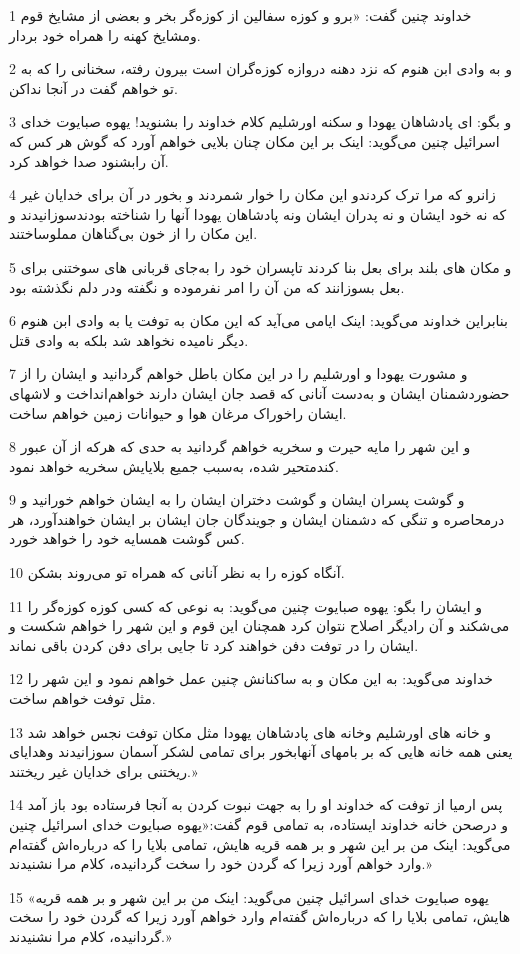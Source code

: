 \par 1 خداوند چنین گفت: «برو و کوزه سفالین از کوزه‌گر بخر و بعضی از مشایخ قوم ومشایخ کهنه را همراه خود بردار.
\par 2 و به وادی ابن هنوم که نزد دهنه دروازه کوزه‌گران است بیرون رفته، سخنانی را که به تو خواهم گفت در آنجا نداکن.
\par 3 و بگو: ای پادشاهان یهودا و سکنه اورشلیم کلام خداوند را بشنوید! یهوه صبایوت خدای اسرائیل چنین می‌گوید: اینک بر این مکان چنان بلایی خواهم آورد که گوش هر کس که آن رابشنود صدا خواهد کرد.
\par 4 زانرو که مرا ترک کردندو این مکان را خوار شمردند و بخور در آن برای خدایان غیر که نه خود ایشان و نه پدران ایشان ونه پادشاهان یهودا آنها را شناخته بودندسوزانیدند و این مکان را از خون بی‌گناهان مملوساختند.
\par 5 و مکان های بلند برای بعل بنا کردند تاپسران خود را به‌جای قربانی های سوختنی برای بعل بسوزانند که من آن را امر نفرموده و نگفته ودر دلم نگذشته بود.
\par 6 بنابراین خداوند می‌گوید: اینک ایامی می‌آید که این مکان به توفت یا به وادی ابن هنوم دیگر نامیده نخواهد شد بلکه به وادی قتل.
\par 7 و مشورت یهودا و اورشلیم را در این مکان باطل خواهم گردانید و ایشان را از حضوردشمنان ایشان و به‌دست آنانی که قصد جان ایشان دارند خواهم‌انداخت و لاشهای ایشان راخوراک مرغان هوا و حیوانات زمین خواهم ساخت.
\par 8 و این شهر را مایه حیرت و سخریه خواهم گردانید به حدی که هر‌که از آن عبور کندمتحیر شده، به‌سبب جمیع بلایایش سخریه خواهد نمود.
\par 9 و گوشت پسران ایشان و گوشت دختران ایشان را به ایشان خواهم خورانید و درمحاصره و تنگی که دشمنان ایشان و جویندگان جان ایشان بر ایشان خواهند‌آورد، هر کس گوشت همسایه خود را خواهد خورد.
\par 10 آنگاه کوزه را به نظر آنانی که همراه تو می‌روند بشکن.
\par 11 و ایشان را بگو: یهوه صبایوت چنین می‌گوید: به نوعی که کسی کوزه کوزه‌گر را می‌شکند و آن رادیگر اصلاح نتوان کرد همچنان این قوم و این شهر را خواهم شکست و ایشان را در توفت دفن خواهند کرد تا جایی برای دفن کردن باقی نماند.
\par 12 خداوند می‌گوید: به این مکان و به ساکنانش چنین عمل خواهم نمود و این شهر را مثل توفت خواهم ساخت.
\par 13 و خانه های اورشلیم وخانه های پادشاهان یهودا مثل مکان توفت نجس خواهد شد یعنی همه خانه هایی که بر بامهای آنهابخور برای تمامی لشکر آسمان سوزانیدند وهدایای ریختنی برای خدایان غیر ریختند.»
\par 14 پس ارمیا از توفت که خداوند او را به جهت نبوت کردن به آنجا فرستاده بود باز آمد و درصحن خانه خداوند ایستاده، به تمامی قوم گفت:«یهوه صبایوت خدای اسرائیل چنین می‌گوید: اینک من بر این شهر و بر همه قریه هایش، تمامی بلایا را که درباره‌اش گفته‌ام وارد خواهم آورد زیرا که گردن خود را سخت گردانیده، کلام مرا نشنیدند.»
\par 15 «یهوه صبایوت خدای اسرائیل چنین می‌گوید: اینک من بر این شهر و بر همه قریه هایش، تمامی بلایا را که درباره‌اش گفته‌ام وارد خواهم آورد زیرا که گردن خود را سخت گردانیده، کلام مرا نشنیدند.»
 
